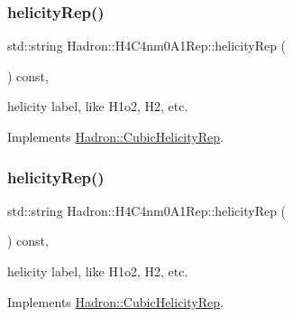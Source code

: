 \mbox{\label{structHadron_1_1H4C4nm0A1Rep_af7a02623676d7d91efa31e3daf15ed8c}} 
\subsubsection{\texorpdfstring{helicityRep()}{helicityRep()}\hspace{0.1cm}{\footnotesize\ttfamily [1/2]}}
{\footnotesize\ttfamily std\+::string Hadron\+::\+H4\+C4nm0\+A1\+Rep\+::helicity\+Rep (\begin{DoxyParamCaption}{ }\end{DoxyParamCaption}) const\hspace{0.3cm}{\ttfamily [inline]}, {\ttfamily [virtual]}}

helicity label, like H1o2, H2, etc. 

Implements \mbox{\hyperlink{structHadron_1_1CubicHelicityRep_af1096946b7470edf0a55451cc662f231}{Hadron\+::\+Cubic\+Helicity\+Rep}}.

\mbox{\label{structHadron_1_1H4C4nm0A1Rep_af7a02623676d7d91efa31e3daf15ed8c}} 
\subsubsection{\texorpdfstring{helicityRep()}{helicityRep()}\hspace{0.1cm}{\footnotesize\ttfamily [2/2]}}
{\footnotesize\ttfamily std\+::string Hadron\+::\+H4\+C4nm0\+A1\+Rep\+::helicity\+Rep (\begin{DoxyParamCaption}{ }\end{DoxyParamCaption}) const\hspace{0.3cm}{\ttfamily [inline]}, {\ttfamily [virtual]}}

helicity label, like H1o2, H2, etc. 

Implements \mbox{\hyperlink{structHadron_1_1CubicHelicityRep_af1096946b7470edf0a55451cc662f231}{Hadron\+::\+Cubic\+Helicity\+Rep}}.

\mbox{\label{structHadron_1_1H4C4nm0A1Rep_a3f4b3af1601f3bc5c2a954c3e8c13c18}} 
